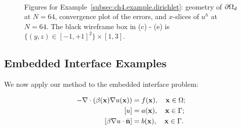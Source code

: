 \setlength{\figureheighti}{0.43\textwidth}
\setlength{\figurewidthii}{0.33\textwidth}
\begin{figure}[htbp]
\centering
{}
 \\
\caption{Figures for Example~\ref{subsec:ch4.example.dirichlet}: geometry of $\partial\Omega_d$ at $N = 64$, convergence plot of the errors, and $x$-slices of $u^h$ at $N = 64$. The black wireframe box in (c) - (e) is $\{(y,z) \in [-1,+1]^2\} \times [1,3]$.}
\label{fig:ch4.examples.dirichlet}
\end{figure}

\subsection{Embedded Interface Examples} \label{subsec:ch4.examples.interface}

We now apply our method to the embedded interface problem:

\begin{align*}
-\nabla \cdot \left( \beta(\mathbf{x}) \nabla u(\mathbf{x}) \right) & = f(\mathbf{x}), \quad \mathbf{x} \in \Omega; \\
\left[ u \right] & = a(\mathbf{x}), \quad \mathbf{x} \in \Gamma; \\
\left[ \beta \nabla u \cdot \hat{\mathbf{n}} \right] & = b(\mathbf{x}), \quad \mathbf{x} \in \Gamma.
\end{align*}

